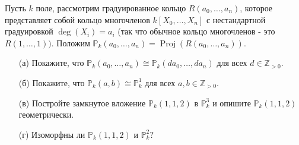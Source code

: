 \begin{prob}
Пусть $k$ поле, рассмотрим градуированное кольцо $R\left(a_0, \ldots, a_n\right)$, которое представляет собой кольцо многочленов $k\left[X_0, \ldots, X_n\right]$ с нестандартной градуировкой $\operatorname{deg}\left(X_i\right)=a_i$ (так что обычное кольцо многочленов - это $R(1, \ldots, 1))$. Положим $\mathbb{P}_k\left(a_0, \ldots, a_n\right)=\operatorname{Proj}\left(R\left(a_0, \ldots, a_n\right)\right)$.
\begin{itemize}
\item[(а)] Покажите, что $\mathbb{P}_k\left(a_0, \ldots, a_n\right) \cong \mathbb{P}_k\left(d a_0, \ldots, d a_n\right)$ для всех $d \in \mathbb{Z}_{>0}$.
\item[(б)] Покажите, что $\mathbb{P}_k(a, b) \cong \mathbb{P}_k^1$ для всех $a, b \in \mathbb{Z}_{>0}$.
\item[(в)] Постройте замкнутое вложение $\mathbb{P}_k(1,1,2)$ в $\mathbb{P}_k^3$ и опишите $\mathbb{P}_k(1,1,2)$ геометрически.
\item[(г)] Изоморфны ли $\mathbb{P}_k(1,1,2)$ и $\mathbb{P}_k^2 ?$
\end{itemize}
\end{prob}
